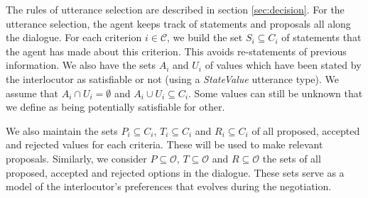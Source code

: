\documentclass{llncs}
\begin{document}
		\medskip
		The rules of utterance selection are described in section \ref{sec:decision}. For the utterance selection, the agent keeps track of statements and proposals all along the dialogue. For each criterion $i\in\mathcal{C}$, we build the set $S_i \subseteq C_i$ of statements that the agent has made about this criterion. This avoids re-statements of previous information. We also have the sets $A_i$ and $U_i$ of values which have been stated by the interlocutor as satisfiable or not (using a \emph{StateValue} utterance type). We assume that $A_i\cap U_i=\emptyset$ and $A_i\cup U_i\subseteq C_i$. Some values can still be unknown that we define as being potentially satisfiable for other.
		
		We also maintain the sets $P_i \subseteq C_i$, $T_i\subseteq C_i$ and $R_i\subseteq C_i$ of all proposed, accepted and rejected values for each criteria. These will be used to make relevant proposals. Similarly, we consider $P\subseteq \mathcal{O}$, $T\subseteq \mathcal{O}$ and $R\subseteq \mathcal{O}$ the sets of all proposed, accepted and rejected options in the dialogue.
		 These sets serve as a model of the interlocutor's preferences that evolves during the negotiation. 
		 
\end{document}
